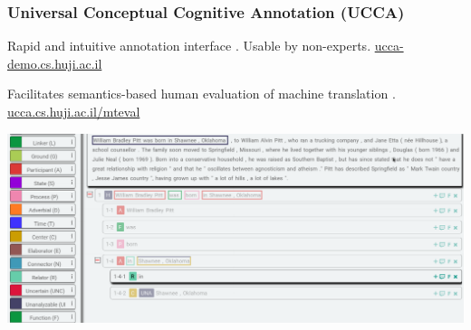 \documentclass[t]{beamer}
\begin{document}
\begin{frame}
\frametitle{Universal Conceptual Cognitive Annotation (UCCA)}
Rapid and intuitive annotation interface \cite{abend2017uccaapp}.
Usable by non-experts.
\hfill\url{ucca-demo.cs.huji.ac.il}
\vfill

Facilitates semantics-based human evaluation of machine translation \cite{birch2016hume}.
\hfill\url{ucca.cs.huji.ac.il/mteval}
\vfill
\begin{adjustbox}{center}
  \includegraphics[width=\pagewidth,height=\textheight,keepaspectratio]{uccaapp.png}
\end{adjustbox}
\end{frame}
\end{document}
